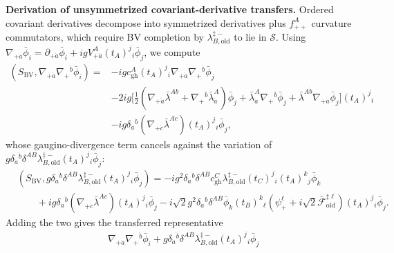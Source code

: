 \documentclass[11pt]{article}
\numberwithin{equation}{section}
\numberwithin{figure}{section}
\numberwithin{table}{section}
\begin{document}
\begin{proofbox}
\textbf{Derivation of unsymmetrized covariant-derivative transfers.} Ordered covariant derivatives decompose into symmetrized derivatives plus $f_{++}^A$ curvature commutators, which require BV completion by $\lambda_{B,\mathrm{old}}^{\ddagger-}$ to lie in $\mathcal S$. Using $\nabla_{+\dot a}\bar\phi_i=\partial_{+\dot a}\bar\phi_i+igV_{+\dot a}^A(t_A)^j{}_i\bar\phi_j$, we compute
\begin{equation}\label{eq-ordered-scalar-variation}
\begin{aligned}
(S_{\mathrm{BV}},\nabla_{+\dot a}\nabla_+{}^{\dot b}\bar\phi_i)
={}&-igc_{\mathrm{gh}}^A(t_A)^j{}_i\nabla_{+\dot a}\nabla_+{}^{\dot b}\bar\phi_j\\
&-2ig\Big[
 \frac12\left(\nabla_{+\dot a}\bar\lambda^{A\dot b}
 +\nabla_+{}^{\dot b}\bar\lambda_{\dot a}^A\right)\bar\phi_j
 +\bar\lambda_{\dot a}^A\nabla_+{}^{\dot b}\bar\phi_j
 +\bar\lambda^{A\dot b}\nabla_{+\dot a}\bar\phi_j
 \Big](t_A)^j{}_i\\
&-ig\delta_{\dot a}{}^{\dot b}
 (\nabla_{+\dot c}\bar\lambda^{A\dot c})
 (t_A)^j{}_i\bar\phi_j,
\end{aligned}
\end{equation}
whose gaugino-divergence term cancels against the variation of $g\delta_{\dot a}{}^{\dot b}\delta^{AB}\lambda_{B,\mathrm{old}}^{\ddagger-}(t_A)^j{}_i\bar\phi_j$:
\begin{equation}\label{eq-ordered-scalar-complement}
\begin{aligned}
&\left(S_{\mathrm{BV}},
g\delta_{\dot a}{}^{\dot b}\delta^{AB}\lambda_{B,\mathrm{old}}^{\ddagger-}
 (t_A)^j{}_i\bar\phi_j\right)
=-ig^2\delta_{\dot a}{}^{\dot b}\delta^{AB}c_{\mathrm{gh}}^C
\lambda_{B,\mathrm{old}}^{\ddagger-}(t_C)^j{}_i(t_A)^k{}_j\bar\phi_k\\
&\qquad+ig\delta_{\dot a}{}^{\dot b}
 (\nabla_{+\dot c}\bar\lambda^{A\dot c})(t_A)^j{}_i\bar\phi_j
-i\sqrt2g^2\delta_{\dot a}{}^{\dot b}\delta^{AB}
 \bar\phi_k(t_B)^k{}_\ell
 \left(\psi_+^\ell+i\sqrt2\bar{\mathcal F}_{\mathrm{old}}^{\ddagger\ell}\right)
 (t_A)^j{}_i\bar\phi_j.
\end{aligned}
\end{equation}
Adding the two gives the transferred representative
\begin{equation}\label{eq-B-16}
\begin{aligned}
&\nabla_{+\dot a}\nabla_+{}^{\dot b}\bar\phi_i
+g\delta_{\dot a}{}^{\dot b}\delta^{AB}\lambda_{B,\mathrm{old}}^{\ddagger-}
 (t_A)^j{}_i\bar\phi_j\\

\end{aligned}
\end{equation}
\end{proofbox}
\end{document}
